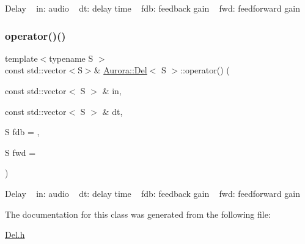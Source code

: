 Delay ~\newline
in\+: audio ~\newline
dt\+: delay time ~\newline
fdb\+: feedback gain ~\newline
fwd\+: feedforward gain \mbox{\label{class_aurora_1_1_del_a7b07356cf07e48791929e7c99c907650}} 
\subsubsection{\texorpdfstring{operator()()}{operator()()}\hspace{0.1cm}{\footnotesize\ttfamily [2/2]}}
{\footnotesize\ttfamily template$<$typename S $>$ \\
const std\+::vector$<$S$>$\& \hyperlink{class_aurora_1_1_del}{Aurora\+::\+Del}$<$ S $>$\+::operator() (\begin{DoxyParamCaption}\item[{const std\+::vector$<$ S $>$ \&}]{in,  }\item[{const std\+::vector$<$ S $>$ \&}]{dt,  }\item[{S}]{fdb = {},  }\item[{S}]{fwd = {} }\end{DoxyParamCaption})\hspace{0.3cm}{\ttfamily [inline]}}

Delay ~\newline
in\+: audio ~\newline
dt\+: delay time ~\newline
fdb\+: feedback gain ~\newline
fwd\+: feedforward gain 

The documentation for this class was generated from the following file\+:\begin{DoxyCompactItemize}
\item 
\hyperlink{_del_8h}{Del.\+h}\end{DoxyCompactItemize}
